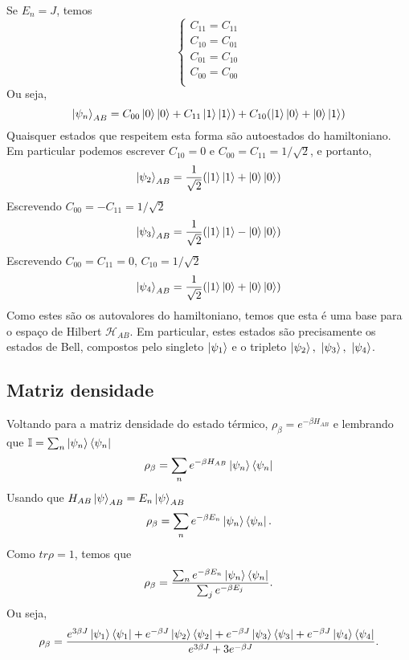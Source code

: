 \documentclass[
12pt,				%
openright,			%
oneside,			%
a4paper,			%
english,			%
french,				%
spanish,			%
brazil				%
]{abntex2}
\begin{document}
Se $E_n=J$, temos 
\begin{equation}
	\begin{cases}
	C_{11} = C_{11}\\
	C_{10} =C_{01}\\
	C_{01} =C_{10}\\
	C_{00}= C_{00}\\
  \end{cases}
\end{equation}
Ou seja, 
\begin{equation}
	\ket{\psi_n}_{AB}= C_{00}\ket{0}\ket{0} + C_{11}\ket{1}\ket{1}) + C_{10}(\ket{1}\ket{0}+\ket{0}\ket{1})   
\end{equation}
Quaisquer estados que respeitem esta forma são autoestados do hamiltoniano. Em particular podemos escrever $C_{10}=0$ e $C_{00}=C_{11}= 1/\sqrt{2}$, e portanto,
\begin{equation}
	\ket{\psi_2}_{AB}= \frac{1}{\sqrt{2}}(\ket{1}\ket{1}+ \ket{0}\ket{0})   
\end{equation}  
Escrevendo $C_{00}=-C_{11}= 1/\sqrt{2}$
\begin{equation}
	\ket{\psi_3}_{AB}= \frac{1}{\sqrt{2}}(\ket{1}\ket{1}- \ket{0}\ket{0})   
\end{equation}  
Escrevendo $C_{00}=C_{11}=0$, $C_{10}= 1/\sqrt{2}$
\begin{equation}
	\ket{\psi_4}_{AB}= \frac{1}{\sqrt{2}}(\ket{1}\ket{0}+ \ket{0}\ket{0})   
\end{equation}  
Como estes são os autovalores do hamiltoniano, temos que esta é uma base para o espaço de Hilbert $\mathcal{H}_{AB}$. Em particular, estes estados são precisamente os estados de Bell, compostos pelo singleto $\ket{\psi_1}$ e o tripleto $\ket{\psi_2},~\ket{\psi_3},~\ket{\psi_4}$. 
 \subsection{Matriz densidade}
 
 Voltando para a matriz densidade do estado térmico, $\rho_\beta=e^{-\beta H_{AB}}$ e lembrando que $\mathbb{I}=\sum_n\ket{\psi_n}\bra{\psi_n}$ 
 \begin{equation}
 	\rho_\beta=\sum_ne^{-\beta H_{AB}}\ket{\psi_n}\bra{\psi_n}
 \end{equation}
 Usando que $H_{AB}\ket{\psi}_{AB}=E_n\ket{\psi}_{AB}$
 \begin{equation}
	\rho_\beta=\sum_ne^{-\beta E_n}\ket{\psi_n}\bra{\psi_n}.
\end{equation}
Como $tr \rho=1$, temos que 
 \begin{equation}
	\rho_\beta=\frac{\sum_ne^{-\beta E_n}\ket{\psi_n}\bra{\psi_n}}{\sum_je^{-\beta E_j}}.
\end{equation}
Ou seja,
\begin{equation}
	\rho_\beta=\frac{e^{3\beta J}\ket{\psi_1}\bra{\psi_1}+e^{-\beta J}\ket{\psi_2}\bra{\psi_2}+e^{-\beta J}\ket{\psi_3}\bra{\psi_3}+e^{-\beta J}\ket{\psi_4}\bra{\psi_4}}{e^{3\beta J}+3e^{-\beta J}}.
\end{equation} 
\end{document}
